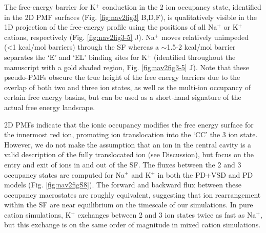 \begin{refsection}
The free-energy barrier for K$^+$ conduction in the 2 ion occupancy state, identified in the 2D PMF surfaces (Fig. \ref{fig:nav2fig3} B,D,F), is qualitatively visible in the 1D projection of the free-energy profile using the positions of all Na$^+$ or K$^+$ cations, respectively (Fig. \ref{fig:nav2fig3-5} J). Na$^+$ moves relatively unimpeded (<1 kcal/mol barriers) through the SF whereas a $\sim$1.5-2 kcal/mol barrier separates the `E' and `EL' binding sites for K$^+$ (identified throughout the manuscript with a gold shaded region, Fig. \ref{fig:nav2fig3-5} J). Note that these pseudo-PMFs obscure the true height of the free energy barriers due to the overlap of both two and three ion states, as well as the multi-ion occupancy of certain free energy basins, but can be used as a short-hand signature of the actual free energy landscape. 

2D PMFs indicate that the ionic occupancy modifies the free energy surface for the innermost red ion, promoting ion translocation into the `CC' the 3 ion state. However, we do not make the assumption that an ion in the central cavity is a valid description of the fully translocated ion (see Discussion), but focus on the entry and exit of ions in and out of the SF. The fluxes between the 2 and 3 occupancy states are computed for Na$^+$ and K$^+$ in both the PD+VSD and PD models (Fig. \ref{fig:nav2figS8}). The forward and backward flux between these occupancy macrostates are roughly equivalent, suggesting that ion rearrangement within the SF are near equilibrium on the timescale of our simulations. In pure cation simulations, K$^+$ exchanges between 2 and 3 ion states twice as fast as Na$^+$, but this exchange is on the same order of magnitude in mixed cation simulations.


\end{refsection}
